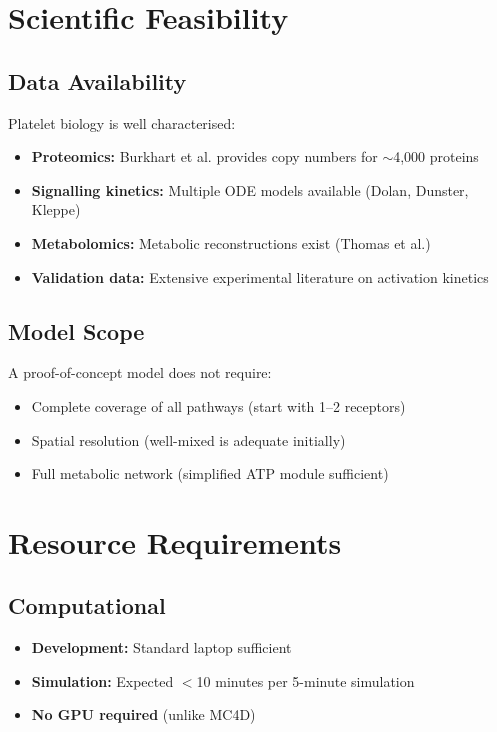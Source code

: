 \documentclass[11pt,a4paper]{report}
\begin{document}
\section{Scientific Feasibility}

\subsection{Data Availability}

Platelet biology is well characterised:

\begin{itemize}
    \item \textbf{Proteomics:} Burkhart et al. provides copy numbers for $\sim$4,000 proteins
    \item \textbf{Signalling kinetics:} Multiple ODE models available (Dolan, Dunster, Kleppe)
    \item \textbf{Metabolomics:} Metabolic reconstructions exist (Thomas et al.)
    \item \textbf{Validation data:} Extensive experimental literature on activation kinetics
\end{itemize}

\subsection{Model Scope}

A proof-of-concept model does not require:

\begin{itemize}
    \item Complete coverage of all pathways (start with 1--2 receptors)
    \item Spatial resolution (well-mixed is adequate initially)
    \item Full metabolic network (simplified ATP module sufficient)
\end{itemize}

\section{Resource Requirements}

\subsection{Computational}

\begin{itemize}
    \item \textbf{Development:} Standard laptop sufficient
    \item \textbf{Simulation:} Expected $<$10 minutes per 5-minute simulation
    \item \textbf{No GPU required} (unlike MC4D)
\end{itemize}
\end{document}
